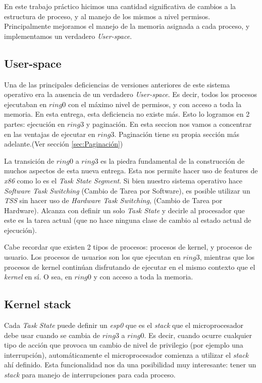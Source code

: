 \documentclass[a4paper,10pt]{article}
\begin{document}
En este trabajo práctico hicimos una cantidad significativa de cambios a la estructura de proceso, y al manejo de los mismos a nivel permisos.
Principalmente mejoramos el manejo de la memoria asignada a cada proceso, y implementamos un verdadero \textit{User-space}.

\subsection{User-space}
Una de las principales deficiencias de versiones anteriores de este sistema operativo era la ausencia de un verdadero \textit{User-space}.
Es decir, todos los procesos ejecutaban en $ring 0$ con el máximo nivel de permisos, y con acceso a toda la memoria.
En esta entrega, esta deficiencia no existe más.
Esto lo logramos en 2 partes: ejecución en $ring 3$ y paginación.
En esta seccion nos vamos a concentrar en las ventajas de ejecutar en $ring 3$. 
Paginación tiene su propia sección más adelante.(Ver sección \ref{sec:Paginación})


La transición de $ring 0$ a $ring 3$ es la piedra fundamental de la construcción de muchos aspectos de esta nueva entrega.
Esta nos permite hacer uso de features de \textit{x86} como lo es el \textit{Task State Segment}.
Si bien nuestro sistema operativo hace \textit{Software Task Switching} (Cambio de Tarea por Software), es posible utilizar un \textit{TSS} sin hacer uso de 
\textit{Hardware Task Switching}, (Cambio de Tarea por Hardware).
Alcanza con definir un solo \textit{Task State} y decirle al procesador que este es la tarea actual 
(que no hace ninguna clase de cambio al estado actual de ejecución).

Cabe recordar que existen 2 tipos de procesos: procesos de kernel, y procesos de usuario.
Los procesos de usuarios son los que ejecutan en $ring 3$, mientras que los procesos de kernel continúan disfrutando de ejecutar en el mismo contexto 
que el \textit{kernel} en sí. O sea, en $ring 0$ y con acceso a toda la memoria.

\subsection{Kernel stack}

Cada \textit{Task State} puede definir un \textit{esp0} que es el \textit{stack} que el microprocesador debe usar cuando se cambia de $ring 3$ a $ring 0$.
Es decir, cuando ocurre cualquier tipo de acción que provoca un cambio de nivel de privilegio (por ejemplo una interrupción), automáticamente el microprocesador 
comienza a utilizar el \textit{stack} ahí definido.
Esta funcionalidad nos da una posibilidad muy interesante: tener un \textit{stack} para manejo de interrupciones para cada proceso.
\end{document}
